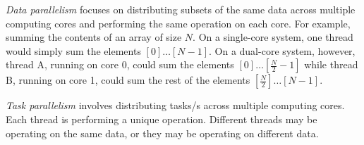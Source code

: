 \begin{definition}\label{def:Data_Parallelism}
  \emph{Data parallelism} focuses on distributing subsets of the same data across multiple computing cores and performing the same operation on each core.
  For example, summing the contents of an array of size $N$.
  On a single-core system, one thread would simply sum the elements $[0] \ldots [N-1]$.
  On a dual-core system, however, thread A, running on core 0, could sum the elements $[0] \ldots [\frac{N}{2}-1]$ while thread B, running on core 1, could sum the rest of the elements $[\frac{N}{2}] \ldots [N-1]$.
\end{definition}

\begin{definition}\label{def:Task_Parallelism}
  \emph{Task parallelism} involves distributing tasks/s across multiple computing cores.
  Each thread is performing a unique operation.
  Different threads may be operating on the same data, or they may be operating on different data.
\end{definition}












